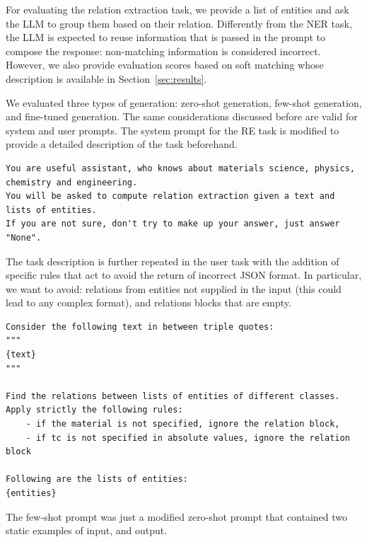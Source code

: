 \documentclass[a4paper]{article}
\begin{document}
For evaluating the relation extraction task, we provide a list of entities and ask the LLM to group them based on their relation. 
Differently from the NER task, the LLM is expected to reuse information that is passed in the prompt to compose the response: non-matching information is considered incorrect. 
However, we also provide evaluation scores based on soft matching whose description is available in Section~\ref{sec:results}. 

We evaluated three types of generation: zero-shot generation, few-shot generation, and fine-tuned generation. 
The same considerations discussed before are valid for system and user prompts. 
The system prompt for the RE task is modified to provide a detailed description of the task beforehand. 

\begin{lstlisting}[caption=System prompt]
You are useful assistant, who knows about materials science, physics, chemistry and engineering.
You will be asked to compute relation extraction given a text and lists of entities. 
If you are not sure, don't try to make up your answer, just answer "None". 
\end{lstlisting}

The task description is further repeated in the user task with the addition of specific rules that act to avoid the return of incorrect JSON format. 
In particular, we want to avoid: relations from entities not supplied in the input (this could lead to any complex format), and relations blocks that are empty. 

\begin{lstlisting}[caption=Relation extraction using zero-shot generation]
Consider the following text in between triple quotes: 
"""
{text}
"""

Find the relations between lists of entities of different classes. 
Apply strictly the following rules:  
    - if the material is not specified, ignore the relation block,
    - if tc is not specified in absolute values, ignore the relation block 
    
Following are the lists of entities: 
{entities}
\end{lstlisting}

The few-shot prompt was just a modified zero-shot prompt that contained two static examples of input, and output. 
\end{document}
